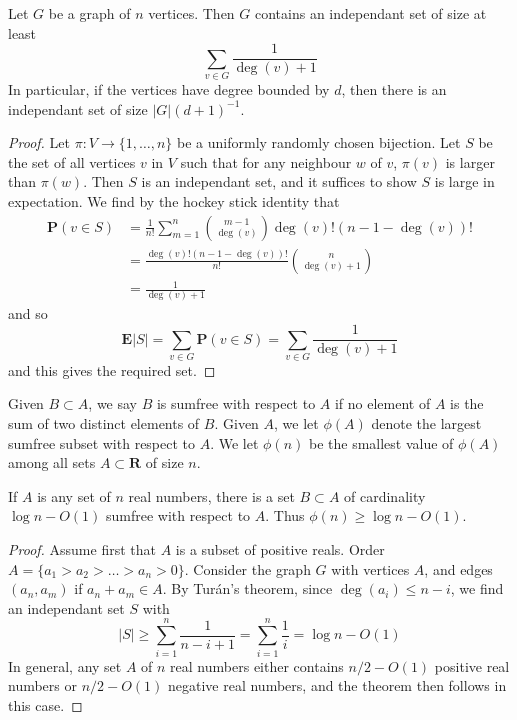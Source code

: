 \begin{theorem}[Tur\'{a}n]
    Let $G$ be a graph of $n$ vertices. Then $G$ contains an independant set of size at least
    \[ \sum_{v \in G} \frac{1}{\deg(v) + 1} \]
    In particular, if the vertices have degree bounded by $d$, then there is an independant set of size $|G|(d+1)^{-1}$.
\end{theorem}
\begin{proof}
    Let $\pi: V \to \{ 1, \dots, n \}$ be a uniformly randomly chosen bijection. Let $S$ be the set of all vertices $v$ in $V$ such that for any neighbour $w$ of $v$, $\pi(v)$ is larger than $\pi(w)$. Then $S$ is an independant set, and it suffices to show $S$ is large in expectation. We find by the hockey stick identity that
    \begin{align*}
        \mathbf{P}(v \in S) &= \frac{1}{n!} \sum_{m = 1}^n {m-1 \choose \deg(v)} \deg(v)! (n - 1 - \deg(v))!\\
        &= \frac{\deg(v)! (n - 1- \deg(v))!}{n!} {n \choose \deg(v)+1}\\
        &= \frac{1}{\deg(v)+1}
    \end{align*}
    and so
    \[ \mathbf{E}|S| = \sum_{v \in G} \mathbf{P}(v \in S) = \sum_{v \in G} \frac{1}{\deg(v) + 1} \]
    and this gives the required set.
\end{proof}

Given $B \subset A$, we say $B$ is sumfree with respect to $A$ if no element of $A$ is the sum of two distinct elements of $B$. Given $A$, we let $\phi(A)$ denote the largest sumfree subset with respect to $A$. We let $\phi(n)$ be the smallest value of $\phi(A)$ among all sets $A \subset \mathbf{R}$ of size $n$.

\begin{theorem}[Choi]
    If $A$ is any set of $n$ real numbers, there is a set $B \subset A$ of cardinality $\log n - O(1)$ sumfree with respect to $A$. Thus $\phi(n) \geq \log n - O(1)$.
\end{theorem}
\begin{proof}
    Assume first that $A$ is a subset of positive reals. Order $A = \{ a_1 > a_2 > \dots > a_n > 0 \}$. Consider the graph $G$ with vertices $A$, and edges $(a_n, a_m)$ if $a_n + a_m \in A$. By Tur\'{a}n's theorem, since $\deg(a_i) \leq n - i$, we find an independant set $S$ with
    \[ |S| \geq \sum_{i = 1}^n \frac{1}{n - i + 1} = \sum_{i = 1}^n \frac{1}{i} = \log n - O(1) \]
    In general, any set $A$ of $n$ real numbers either contains $n/2 - O(1)$ positive real numbers or $n/2 - O(1)$ negative real numbers, and the theorem then follows in this case.
\end{proof}

